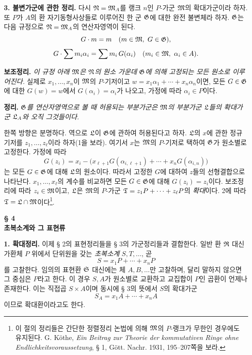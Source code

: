 \noindent\textbf{3. 불변가군에 관한 정리.} 다시 \(\mathfrak N=\mathfrak M_A\)를 랭크 \(n\)인 \(P\)-가군 \(\mathfrak M\)의 확대가군이라 하자. 또 \(P\)가 \(A\)의 환 자기동형사상들로 이루어진 한 군 \(\mathfrak G\)에 대한 완전 불변체라 하자. \(\mathfrak G\)는 다음 규정으로 \(\mathfrak N=\mathfrak M_A\)의 연산자영역이 된다.
\[
G\cdot m=m\quad(m\in\mathfrak M,\ G\in\mathfrak G),
\]
\[
G\cdot\sum m_i\alpha_i=\sum m_i\,G(\alpha_i)
\quad(m_i\in\mathfrak M,\ \alpha_i\in A).
\]

\noindent\textbf{보조정리.} \emph{이 규정 아래 \(\mathfrak M\)은 \(\mathfrak N\)의 원소 가운데 \(\mathfrak G\)에 의해 고정되는 모든 원소로 이루어진다.} 실제로 \(x_1,\ldots,x_n\)이 \(\mathfrak M\)의 \(P\)-기저이고 \(w=x_1\alpha_1+\cdots+x_n\alpha_n\)이면, 모든 \(G\in\mathfrak G\)에 대한 \(G(w)=w\)에서 \(G(\alpha_i)=\alpha_i\)가 나오고, 가정에 따라 \(\alpha_i\in P\)이다.

\noindent\textbf{정리.} \emph{\(\mathfrak G\)를 연산자영역으로 볼 때 허용되는 부분가군은 \(\mathfrak M\)의 부분가군 \(\mathfrak L\)들의 확대가군 \(\mathfrak L_A\)와 오직 그것들이다.}

한쪽 방향은 분명하다. 역으로 \(\mathfrak L\)이 \(\mathfrak G\)에 관하여 허용된다고 하자. \(\mathfrak L\)의 \(x\)에 관한 정규기저를 \(z_1,\ldots,z_\ell\)이라 하자(1을 보라). 여기서 \(x\)는 \(\mathfrak M\)의 \(P\)-기저로 택하여 \(\mathfrak G\)가 원소별로 고정한다. 가정에 따라
\[
G(z_i)=x_i-\bigl(x_{\ell+1}G(\alpha_{i,\ell+1})
              +\cdots+x_nG(\alpha_{i,n})\bigr)
\]
는 모든 \(G\in\mathfrak G\)에 대해 \(\mathfrak L\)의 원소이다. 따라서 고정한 \(G\)에 대하여 \(z\)들의 선형결합으로 나타난다. \(x_1,\ldots,x_\ell\)의 계수를 비교하면 모든 \(G\in\mathfrak G\)에 대해 \(G(z_i)=z_i\)이다. 보조정리에 따라 \(z_i\in\mathfrak M\)이고, \(\mathfrak L\)은 \(\mathfrak M\)의 \(P\)-가군 \(\mathfrak T=z_1P+\cdots+z_\ell P\)의 \emph{확대}이다. 2에 따라 \(\mathfrak T=\mathfrak L\cap\mathfrak M\)이다\footnote{이 절의 정리들은 간단한 정렬정리 논법에 의해 \(\mathfrak M\)의 \(P\)-랭크가 무한인 경우에도 유지된다. G. Köthe, \emph{Ein Beitrag zur Theorie der kommutativen Ringe ohne Endlichkeitsvoraussetzung}, § 1, Gött. Nachr. 1931, 195--207쪽을 보라.}.

\begin{center}
\textbf{§ 4}\\[0.5em]
\textbf{초복소계와 그 표현류}
\end{center}

\noindent\textbf{1. 확대정리.} 이제 § 2의 표현정리들을 § 3의 가군정리들과 결합한다. 일반 환 \(\mathfrak R\) 대신 가환체 \(P\) 위에서 단위원을 갖는 \emph{초복소계} \(S,T,\ldots\), 곧
\[
S=x_1P+\cdots+x_nP
\]
를 고찰한다. 임의의 표현환 \(\mathfrak S\) 대신에는 체 \(A,B,\ldots\)만 고찰하며, 달리 말하지 않으면 그 중심은 \(P\)라고 한다. 이 경우 \(S,A\)가 원소별로 교환하고 교집합이 \(P\)인 곱환이 언제나 존재한다. 이는 직접곱 \(S\times A\)이며 동시에 § 3의 뜻에서 \(S\)의 확대가군
\[
S_A=x_1A+\cdots+x_nA
\]
이므로 확대환이라고도 한다.

